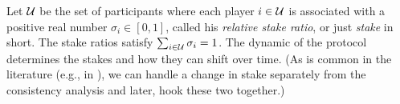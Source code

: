







Let $\mathcal{U}$ be the set of participants 
where each player $i \in \mathcal{U}$ is associated with a positive real number 
$\sigma_i \in [0,1]$, called his \emph{relative stake ratio}, or just \emph{stake} in short. 
The stake ratios satisfy $\sum_{i \in \mathcal{U}} \sigma_i = 1$. 
The dynamic of the protocol determines 
the stakes and how they can shift over time.
(As is common in the literature (e.g., in \cite{Ouroboros,Praos,SnowWhite}), 
we can handle a change in stake separately from the consistency analysis and later, hook these two together.)


